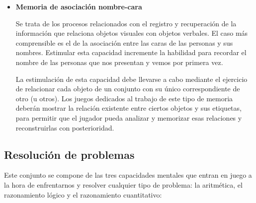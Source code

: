\begin{itemize}
\item {\bf Memoria de asociación nombre-cara}

Se trata de los procesos relacionados con el registro y recuperación de la información que relaciona objetos visuales con objetos verbales. El caso más comprensible es el de la asociación entre las caras de las personas y sus nombres. Estimular esta capacidad incremente la habilidad para recordar el nombre de las personas que nos presentan y vemos por primera vez.

La estimulación de esta capacidad debe llevarse a cabo mediante el ejercicio de relacionar cada objeto de un conjunto con su único correspondiente de otro (u otros). Los juegos dedicados al trabajo de este tipo de memoria deberán mostrar la relación existente entre ciertos objetos y sus etiquetas, para permitir que el jugador pueda analizar y memorizar esas relaciones y reconstruirlas con posterioridad.

\end{itemize}

\subsection{Resolución de problemas}

Este conjunto se compone de las tres capacidades mentales que entran en juego a la hora de enfrentarnos y resolver cualquier tipo de problema: la aritmética, el razonamiento lógico y el razonamiento cuantitativo:

